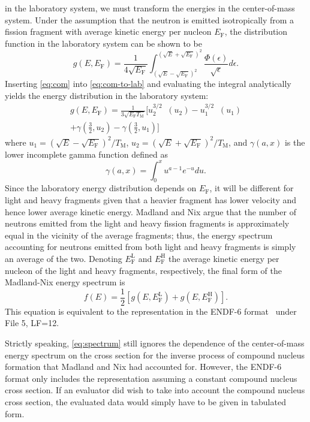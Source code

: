 \documentclass[3p,fleqn]{elsarticle}
\DeclareMathOperator\expint{E_1}
\newcommand{\tmax}{T_{\mathrm{M}}}
\newcommand{\ef}{E_{\mathrm{F}}}
\newcommand{\efl}{E_{\mathrm{F}}^{\mathrm{L}}}
\newcommand{\efh}{E_{\mathrm{F}}^{\mathrm{H}}}
\begin{document}
in the laboratory system, we must transform the energies in the center-of-mass
system. Under the assumption that the neutron is emitted isotropically from a
fission fragment with average kinetic energy per nucleon $\ef$, the distribution
function in the laboratory system can be shown to be~\cite{physrev-terrell-1959}
\begin{equation}
  g(E,\ef) = \frac{1}{4\sqrt{\ef}} \int_{\left( \sqrt{E} - \sqrt{\ef}
    \right)^2}^{\left( \sqrt{E} + \sqrt{\ef} \right)^2}
  \frac{\Phi(\epsilon)}{\sqrt{\epsilon}} d\epsilon.
  \label{eq:com-to-lab}
\end{equation}
Inserting \autoref{eq:com} into \autoref{eq:com-to-lab} and evaluating the integral
analytically yields the energy distribution in the laboratory system:
\begin{multline}
  g(E,\ef) = \frac{1}{3\sqrt{\ef \tmax}} \bigg [ u_2^{3/2} \expint (u_2) -
    u_1^{3/2} \expint (u_1) \\ + \gamma \left( \frac{3}{2}, u_2 \right ) -
    \gamma \left( \frac{3}{2}, u_1 \right) \bigg ]
\end{multline}
where $u_1 = \left ( \sqrt{E} - \sqrt{\ef} \right )^2/\tmax$, $u_2 = \left (
\sqrt{E} + \sqrt{\ef} \right)^2/\tmax$, and $\gamma(a,x)$ is the lower incomplete
gamma function defined as
\begin{equation*}
  \gamma(a,x) = \int_0^x u^{a-1} e^{-u} du.
\end{equation*}
Since the laboratory energy distribution depends on $\ef$, it will be different
for light and heavy fragments given that a heavier fragment has lower velocity
and hence lower average kinetic energy. Madland and Nix argue that the number of
neutrons emitted from the light and heavy fission fragments is approximately
equal in the vicinity of the average fragments; thus, the energy spectrum
accounting for neutrons emitted from both light and heavy fragments is simply an
average of the two. Denoting $\efl$ and $\efh$ the average kinetic energy per
nucleon of the light and heavy fragments, respectively, the final form of the
Madland-Nix energy spectrum is
\begin{equation}
  \label{eq:spectrum}
  f(E) = \frac{1}{2} \left [ g(E, \efl) + g(E, \efh) \right ].
\end{equation}
This equation is equivalent to the representation in the ENDF-6
format~\cite{bnl-trkov-2012} under File 5, LF=12.

Strictly speaking, \autoref{eq:spectrum} still ignores the dependence of the
center-of-mass energy spectrum on the cross section for the inverse process of
compound nucleus formation that Madland and Nix had accounted for. However, the
ENDF-6 format only includes the representation assuming a constant compound
nucleus cross section. If an evaluator did wish to take into account the
compound nucleus cross section, the evaluated data would simply have to be given
in tabulated form.
\end{document}
